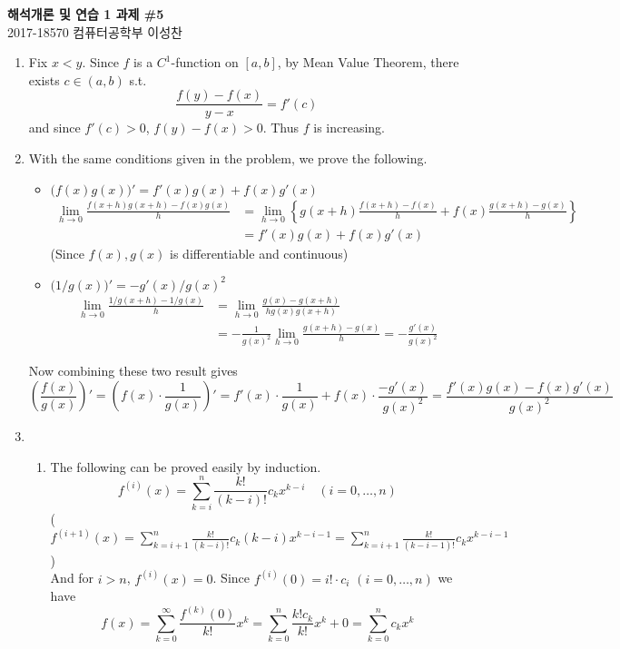 \documentclass[11pt]{report}
\newcommand{\ra}{\rightarrow}
\begin{document}
\begin{center}
\textbf{\Large 해석개론 및 연습 1 과제 \#5}\\
\large 2017-18570 컴퓨터공학부 이성찬
\end{center}
\begin{enumerate}
\item Fix $x < y$. Since $f$ is a $C^1$-function on $[a, b]$, by Mean Value Theorem, there exists $c\in (a, b)$ s.t.
$$\frac{f(y) - f(x)}{y-x} = f'(c)$$
and since $f'(c) > 0$, $f(y) -f(x) > 0$. Thus $f$ is increasing.

\item With the same conditions given in the problem, we prove the following.
\begin{itemize}
	\item $\big(f(x)g(x)\big)' = f'(x)g(x) + f(x)g'(x)$\\
	$$\begin{aligned}
		\lim_{h\ra0} \frac{f(x+h)g(x+h)-f(x)g(x)}{h}&= 
		\lim_{h\ra0} \left\{g(x+h)\frac{f(x+h)-f(x)}{h} + f(x)\frac{g(x+h)-g(x)}{h}\right\}\\
		&=f'(x)g(x)+f(x)g'(x)
	\end{aligned}$$
	(Since $f(x), g(x)$ is differentiable and continuous)
	\item $\big(1/g(x)\big)'=-g'(x) / g(x)^2$\\
	$$\begin{aligned}
		\lim_{h\ra0} \frac{1/g(x+h)-1/g(x)}{h} &= \lim_{h\ra0} \frac{g(x)-g(x+h)}{h g(x)g(x+h)}\\
		&= -\frac{1}{g(x)^2}\lim_{h\ra0} \frac{g(x+h)-g(x)}{h} = -\frac{g'(x)}{g(x)^2}
	\end{aligned}$$
\end{itemize}
Now combining these two result gives $$\left(\frac{f(x)}{g(x)}\right)' = \left(f(x) \cdot \frac{1}{g(x)}\right)' = f'(x) \cdot \frac{1}{g(x)} + f(x) \cdot \frac{-g'(x)}{g(x)^2} = \frac{f'(x)g(x) - f(x)g'(x)}{g(x)^2}$$

\item 
\begin{enumerate}
	\item The following can be proved easily by induction. $$f^{(i)}(x) = \sum_{k=i}^{n} \frac{k!}{(k-i)!} c_k x^{k-i}\quad (i=0, \dots, n)$$
	($f^{(i+1)}(x) = \sum_{k=i+1}^{n} \frac{k!}{(k-i)!}c_k(k-i)x^{k-i-1} = \sum_{k=i+1}^n \frac{k!}{(k-i-1)!}c_kx^{k-i-1}$)\\
	And for $i > n$, $f^{(i)}(x) = 0$. Since $f^{(i)}(0) = i! \cdot c_i$ $(i =0, \dots, n)$ we have
	$$f(x) = \sum_{k=0}^{\infty}\frac{f^{(k)}(0)}{k!}x^k=\sum_{k=0}^n \frac{k!c_k}{k!}x^k + 0 = \sum_{k=0}^n c_kx^k $$
	

\end{enumerate}
\end{enumerate}
\end{document}
